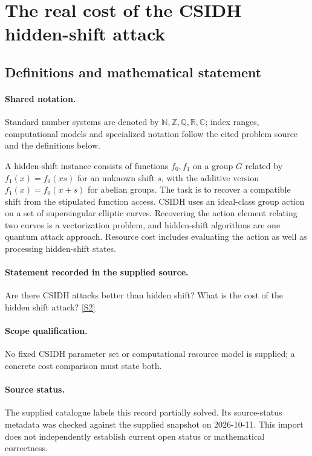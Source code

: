 \documentclass[11pt]{article}
\newcommand{\sref}[2]{\hyperlink{source:#1:#2}{[S#2]}}
\begin{document}
\section{The real cost of the CSIDH hidden-shift attack}\label{statement}

\subsection{Definitions and mathematical statement}

\paragraph{Shared notation.}Standard number systems are denoted by $\mathbb N,\mathbb Z,\mathbb Q,\mathbb R,\mathbb C$; index ranges, computational models and specialized notation follow the cited problem source and the definitions below.


A hidden-shift instance consists of functions $f_0,f_1$ on a group $G$ related by $f_1(x)=f_0(xs)$ for an unknown shift $s$, with the additive version $f_1(x)=f_0(x+s)$ for abelian groups. The task is to recover a compatible shift from the stipulated function access. CSIDH uses an ideal-class group action on a set of supersingular elliptic curves. Recovering the action element relating two curves is a vectorization problem, and hidden-shift algorithms are one quantum attack approach. Resource cost includes evaluating the action as well as processing hidden-shift states.
\paragraph{Statement recorded in the supplied source.}
Are there CSIDH attacks better than hidden shift? What is the cost of the hidden shift attack? \sref{statement}{2}
\paragraph{Scope qualification.}
No fixed CSIDH parameter set or computational resource model is supplied; a concrete cost comparison must state both.
\paragraph{Source status.}
The supplied catalogue labels this record partially solved. Its source-status metadata was checked against the supplied snapshot on 2026-10-11. This import does not independently establish current open status or mathematical correctness.
\end{document}
